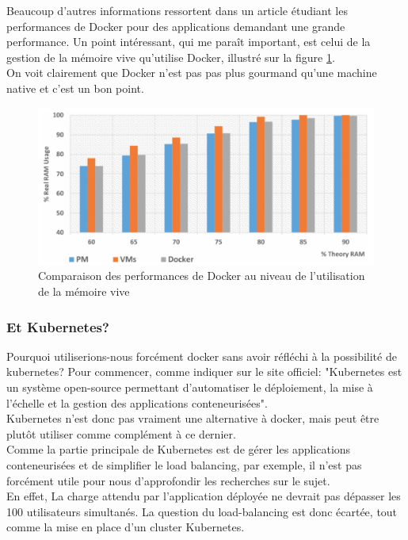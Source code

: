 \documentclass[
    iai, %
    il, %
]{heig-tb}
\begin{document}
Beaucoup d'autres informations ressortent dans un article étudiant les performances de Docker pour
des applications demandant une grande performance. \cite{chung}
Un point intéressant, qui me paraît important, est celui de la gestion de la mémoire vive qu'utilise
Docker, illustré sur la figure \ref{docker-perf-ram}.\\
On voit clairement que Docker n'est pas pas plus gourmand qu'une machine native et c'est un bon point.

\begin{center}
    \begin{figure}
        \includegraphics[width=\textwidth]{./assets/figures/docker-perf-ram.png}
        \caption[Comparaison des perf. Docker sur la RAM]{Comparaison des performances de Docker au
            niveau de l'utilisation de la mémoire vive \cite{chung} \label{docker-perf-ram}}
    \end{figure}
\end{center}


\subsubsection{Et Kubernetes?}
Pourquoi utiliserions-nous forcément docker sans avoir réfléchi à la possibilité de \Gls{kubernetes}?
Pour commencer, comme indiquer sur le site officiel:
"Kubernetes est un système open-source permettant d'automatiser le déploiement, la mise à l'échelle et la gestion des applications conteneurisées".\\
Kubernetes n'est donc pas vraiment une alternative à docker, mais peut être plutôt utiliser comme complément à ce dernier.\\
Comme la partie principale de Kubernetes est de gérer les applications conteneurisées et de simplifier le load balancing, par exemple, il n'est pas forcément utile pour nous d'approfondir les recherches sur le sujet.\\
En effet, La charge attendu par l'application déployée ne devrait pas dépasser les 100 utilisateurs simultanés. La question du load-balancing est donc écartée, tout comme la mise en place d'un cluster Kubernetes.
\end{document}
